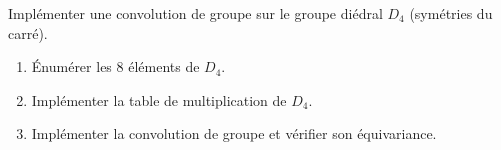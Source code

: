\begin{exercice}
Impl\'ementer une convolution de groupe sur le groupe di\'edral $D_4$
(sym\'etries du carr\'e).
\begin{enumerate}
    \item \'Enum\'erer les 8 \'el\'ements de $D_4$.
    \item Impl\'ementer la table de multiplication de $D_4$.
    \item Impl\'ementer la convolution de groupe et v\'erifier son \'equivariance.
\end{enumerate}
\end{exercice}
